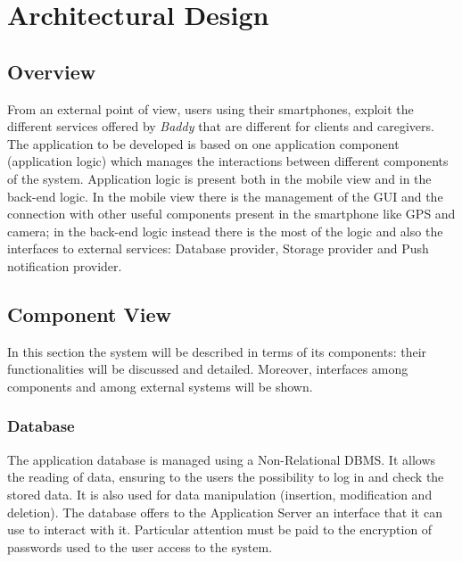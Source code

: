 \documentclass[../../dd.tex]{subfiles}
\begin{document}
    \chapter{Architectural Design}
    \section{Overview}
    From an external point of view, users using their smartphones, exploit the different
    services offered by \textit{Baddy} that are different for clients and caregivers.
    The application to be developed is based on one application component (application logic) which manages the interactions
    between different components of the system.
    Application logic is present both in the mobile view and in the back-end logic.
    In the mobile view there is the management of the GUI and the connection with other useful components
    present in the smartphone like GPS and camera; in the back-end logic instead there is the most of the logic and also the interfaces to external services:
    Database provider, Storage provider and Push notification provider.
    \section{Component View}
    In this section the system will be described in terms of its components: their
    functionalities will be discussed and detailed.
    Moreover, interfaces among components and among external systems will be shown.
    \subsection{Database}
    The application database is managed using a Non-Relational DBMS.
    It allows the reading of data, ensuring to the users the possibility to log in and check the stored data.
    It is also used for data manipulation (insertion, modification and deletion).
    The database offers to the Application Server an interface that it can use
    to interact with it.
    Particular attention must be paid to the encryption of passwords used to the user access to the system.
\end{document}
